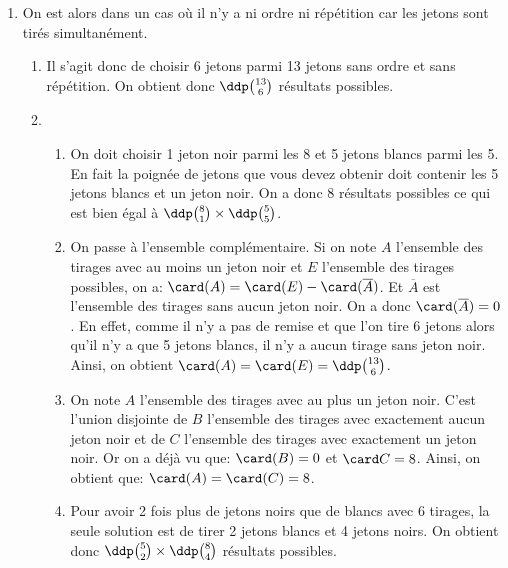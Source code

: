 \documentclass[a4paper, 11pt]{article}
\begin{document}
\begin{correction}
\begin{enumerate}
\begin{enumerate}
\begin{enumerate}
			            \end{enumerate}
		      \end{enumerate}
		\item On est alors dans un cas o\`u il n'y a ni ordre ni r\'ep\'etition car les jetons sont tir\'es simultan\'ement.
		      \begin{enumerate}
			      \item Il s'agit donc de choisir 6 jetons parmi 13 jetons sans ordre et sans r\'ep\'etition. On obtient donc $\ddp \binom{13}{6}$ r\'esultats possibles.
			      \item
			            \begin{enumerate}
				            \item On doit choisir 1 jeton noir parmi les 8 et 5 jetons blancs parmi les 5. En fait la poign\'ee de jetons que vous devez obtenir doit contenir les 5 jetons blancs et un jeton noir. On a donc $8$ r\'esultats possibles ce qui est bien \'egal \`a $\ddp \binom{8}{1}\times \ddp \binom{5}{5}$.
				            \item On passe \`a l'ensemble compl\'ementaire. Si on note $A$ l'ensemble des tirages avec au moins un jeton noir et $E$ l'ensemble des tirages possibles, on a: $\card (A)=\card (E)-\card (\overline{A})$. Et $\overline{A}$ est l'ensemble des tirages sans aucun jeton noir.  On a donc $\card (\overline{A})=0$. En effet, comme il n'y a pas de remise et que l'on tire 6 jetons alors qu'il n'y a que 5 jetons blancs, il n'y a aucun tirage sans jeton noir. Ainsi, on obtient $\card (A)=\card (E)=\ddp \binom{13}{6}$.
				            \item On note $A$ l'ensemble des tirages avec au plus un jeton noir. C'est l'union disjointe de $B$ l'ensemble des tirages avec exactement aucun jeton noir et de $C$ l'ensemble des tirages avec exactement un jeton noir. Or on a d\'ej\`a vu que: $\card (B)=0$ et $\card C=8$. Ainsi, on obtient que: $\card (A)=\card (C)= 8$.
				            \item Pour avoir 2 fois plus de jetons noirs que de blancs avec 6 tirages, la seule solution est de tirer 2 jetons blancs et 4 jetons noirs. On obtient donc $\ddp \binom{5}{2} \times \ddp \binom{8}{4}$ r\'esultats possibles.
			            \end{enumerate}
		      \end{enumerate}
	\end{enumerate}
\end{correction}
\end{document}
